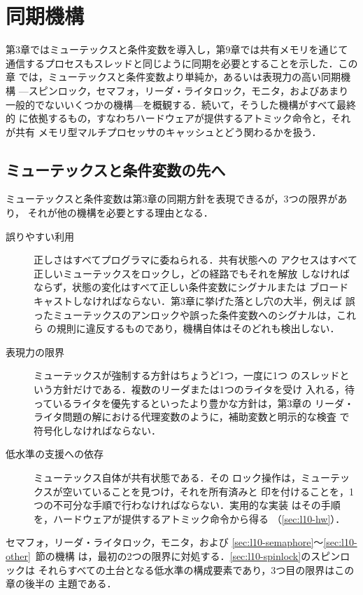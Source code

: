\documentclass[../main.tex]{subfiles}
\begin{document}
\chapter{同期機構}

第3章ではミューテックスと条件変数を導入し，第9章では共有メモリを通じて
通信するプロセスもスレッドと同じように同期を必要とすることを示した．この章
では，ミューテックスと条件変数より単純か，あるいは表現力の高い同期機構
---スピンロック，セマフォ，リーダ・ライタロック，モニタ，およびあまり
一般的でないいくつかの機構---を概観する．続いて，そうした機構がすべて最終的
に依拠するもの，すなわちハードウェアが提供するアトミック命令と，それが共有
メモリ型マルチプロセッサのキャッシュとどう関わるかを扱う．

\section{ミューテックスと条件変数の先へ}
\label{sec:l10-limits}

ミューテックスと条件変数は第3章の同期方針を表現できるが，3つの限界があり，
それが他の機構を必要とする理由となる．
\begin{description}
  \item[誤りやすい利用] 正しさはすべてプログラマに委ねられる．共有状態への
    アクセスはすべて正しいミューテックスをロックし，どの経路でもそれを解放
    しなければならず，状態の変化はすべて正しい条件変数にシグナルまたは
    ブロードキャストしなければならない．第3章に挙げた落とし穴の大半，例えば
    誤ったミューテックスのアンロックや誤った条件変数へのシグナルは，これら
    の規則に違反するものであり，機構自体はそのどれも検出しない．
  \item[表現力の限界] ミューテックスが強制する方針はちょうど1つ，一度に1つ
    のスレッドという方針だけである．複数のリーダまたは1つのライタを受け
    入れる，待っているライタを優先するといったより豊かな方針は，第3章の
    リーダ・ライタ問題の解における代理変数のように，補助変数と明示的な検査
    で符号化しなければならない．
  \item[低水準の支援への依存] ミューテックス自体が共有状態である．その
    ロック操作は，ミューテックスが空いていることを見つけ，それを所有済みと
    印を付けることを，1つの不可分な手順で行わなければならない．実用的な実装
    はその手順を，ハードウェアが提供するアトミック命令から得る
    （\cref{sec:l10-hw}）．
\end{description}
セマフォ，リーダ・ライタロック，モニタ，および
\ref{sec:l10-semaphore}〜\ref{sec:l10-other}~節の機構
は，最初の2つの限界に対処する．\cref{sec:l10-spinlock}のスピンロックは
それらすべての土台となる低水準の構成要素であり，3つ目の限界はこの章の後半の
主題である．
\end{document}
